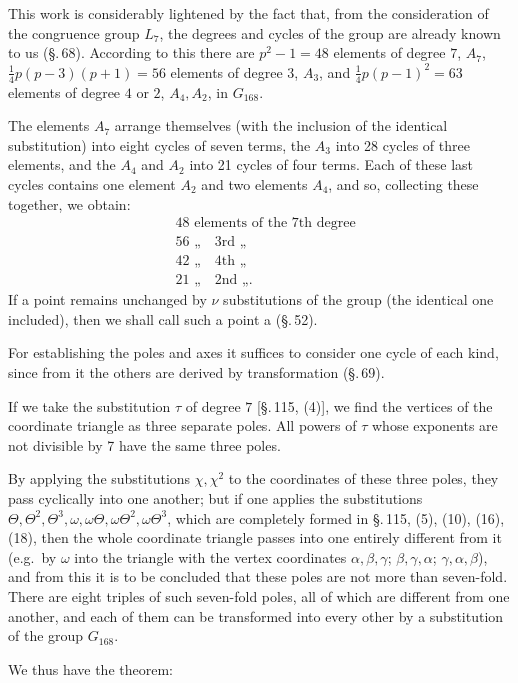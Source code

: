 This work is considerably lightened by the fact that, from the consideration of the congruence group $L_7$, the degrees and cycles of the group are already known to us (\S.\,68). According to this there are $p^2-1=48$ elements of degree $7$, $A_7$, $\frac14 p(p-3)(p+1)=56$ elements of degree $3$, $A_3$, and $\frac14 p(p-1)^2=63$ elements of degree $4$ or $2$, $A_4, A_2$, in $G_{168}$.

The elements $A_7$ arrange themselves (with the inclusion of the identical substitution) into eight cycles of seven terms, the $A_3$ into 28 cycles of three elements, and the $A_4$ and $A_2$ into 21 cycles of four terms. Each of these last cycles contains one element $A_2$ and two elements $A_4$, and so, collecting these together, we obtain:
\[
\begin{aligned}
&48 \text{ elements of the } 7 \text{th degree}\\
&56 \text{ „} \quad 3 \text{rd „}\\
&42 \text{ „} \quad 4 \text{th „}\\
&21 \text{ „} \quad 2 \text{nd „}.
\end{aligned}
\]
If a point remains unchanged by $\nu$ substitutions of the group (the identical one included), then we shall call such a point a  (\S.\,52).

For establishing the poles and axes it suffices to consider one cycle of each kind, since from it the others are derived by transformation (\S.\,69).

If we take the substitution $\tau$ of degree $7$ [\S.\,115, (4)], we find the vertices of the coordinate triangle as three separate poles. All powers of $\tau$ whose exponents are not divisible by 7 have the same three poles.

By applying the substitutions $\chi,\chi^2$ to the coordinates of these three poles, they pass cyclically into one another; but if one applies the substitutions $\Theta,\Theta^2,\Theta^3,\omega,\omega\Theta,\omega\Theta^2,\omega\Theta^3$, which are completely formed in \S.\,115, (5), (10), (16), (18), then the whole coordinate triangle passes into one entirely different from it (e.g.\ by $\omega$ into the triangle with the vertex coordinates $\alpha,\beta,\gamma$; $\beta,\gamma,\alpha$; $\gamma,\alpha,\beta$), and from this it is to be concluded that these poles are not more than seven-fold. There are eight triples of such seven-fold poles, all of which are different from one another, and each of them can be transformed into every other by a substitution of the group $G_{168}$.

We thus have the theorem:
